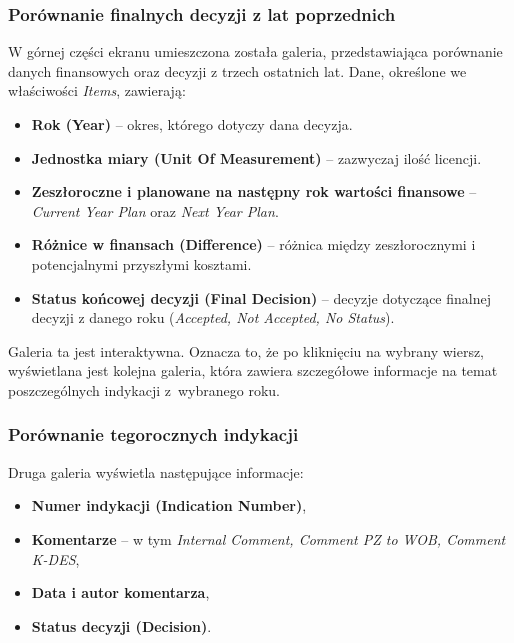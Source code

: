 \subsubsection*{Porównanie finalnych decyzji z lat poprzednich}

W górnej części ekranu umieszczona została galeria, przedstawiająca porównanie danych finansowych oraz decyzji z trzech ostatnich lat. Dane, określone we właściwości \emph{Items}, zawierają:

\begin{itemize}
    \item \textbf{Rok (Year)} -- okres, którego dotyczy dana decyzja.
    \item \textbf{Jednostka miary (Unit Of Measurement)} -- zazwyczaj ilość licencji.
    \item \textbf{Zeszłoroczne i planowane na następny rok wartości finansowe} -- \emph{Current Year Plan} oraz \emph{Next Year Plan}.
    \item \textbf{Różnice w finansach (Difference)} -- różnica między zeszłorocznymi i potencjalnymi przyszłymi kosztami.
    \item \textbf{Status końcowej decyzji (Final Decision)} -- decyzje dotyczące finalnej decyzji z danego roku (\emph{Accepted, Not Accepted, No Status}).
\end{itemize}




Galeria ta jest interaktywna. Oznacza to, że po kliknięciu na wybrany wiersz, wyświetlana jest kolejna galeria, która zawiera szczegółowe informacje na temat poszczególnych indykacji z~wybranego roku.

\subsubsection*{Porównanie tegorocznych indykacji}

Druga galeria wyświetla następujące informacje:
\begin{itemize}
    \item \textbf{Numer indykacji (Indication Number)},
    \item \textbf{Komentarze} -- w tym \emph{Internal Comment, Comment PZ to WOB, Comment K-DES},
    \item \textbf{Data i autor komentarza},
    \item \textbf{Status decyzji (Decision)}.
\end{itemize}

